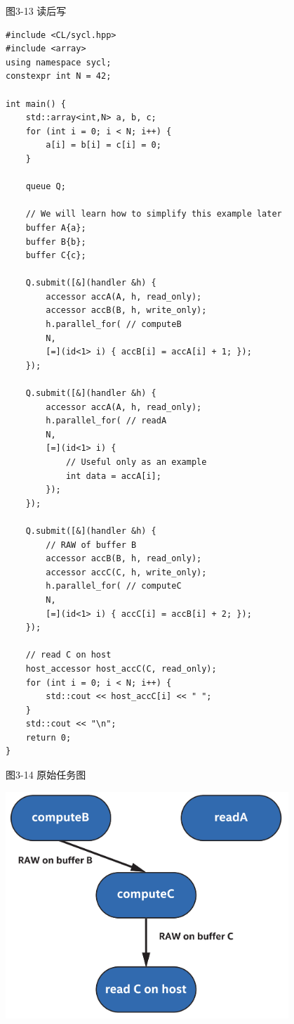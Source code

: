 \hspace*{\fill} \par %
图3-13 读后写
\begin{lstlisting}[caption={}]
#include <CL/sycl.hpp>
#include <array>
using namespace sycl;
constexpr int N = 42;

int main() {
	std::array<int,N> a, b, c;
	for (int i = 0; i < N; i++) {
		a[i] = b[i] = c[i] = 0;
	}

	queue Q;
	
	// We will learn how to simplify this example later
	buffer A{a};
	buffer B{b};
	buffer C{c};
	
	Q.submit([&](handler &h) {
		accessor accA(A, h, read_only);
		accessor accB(B, h, write_only);
		h.parallel_for( // computeB
		N,
		[=](id<1> i) { accB[i] = accA[i] + 1; });
	});

	Q.submit([&](handler &h) {
		accessor accA(A, h, read_only);
		h.parallel_for( // readA
		N,
		[=](id<1> i) {
			// Useful only as an example
			int data = accA[i];
		});
	});

	Q.submit([&](handler &h) {
		// RAW of buffer B
		accessor accB(B, h, read_only);
		accessor accC(C, h, write_only);
		h.parallel_for( // computeC
		N,
		[=](id<1> i) { accC[i] = accB[i] + 2; });
	});

	// read C on host
	host_accessor host_accC(C, read_only);
	for (int i = 0; i < N; i++) {
		std::cout << host_accC[i] << " ";
	}
	std::cout << "\n";
	return 0;
}
\end{lstlisting}

\hspace*{\fill} \par %
图3-14 原始任务图
\begin{center}
	\includegraphics[width=0.8\textwidth]{content/chapter-3/images/8}
\end{center}

